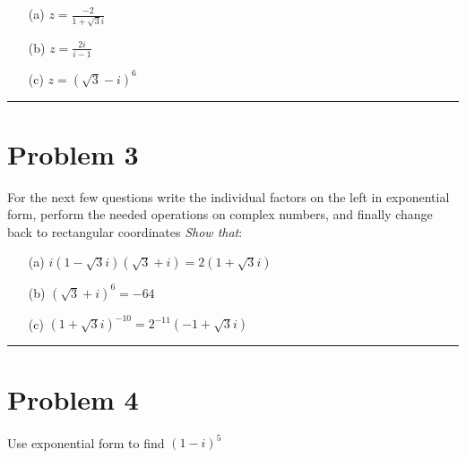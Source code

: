 \documentclass{article}
\begin{document}
\begin{enumerate}
    \item[(a)] $z=\frac{-2}{1+\sqrt{3}i}$ 
    \vspace{4cm}
    
    \item[(b)] $z=\frac{2i}{i-1}$ 
    \vspace{4cm}
    
    \item[(c)] $z=(\sqrt{3}-i)^{6}$ 
    \vspace{4cm}
\end{enumerate}

\hrule

\section*{Problem 3}
For the next few questions write the individual factors on the left in exponential form, perform the needed operations on complex numbers, and finally change back to rectangular coordinates \textit{Show that}: 

\begin{enumerate}
    \item[(a)] $i(1-\sqrt{3}i)(\sqrt{3}+i)=2(1+\sqrt{3}i)$ 
    \vspace{5cm}
    
    \item[(b)] $(\sqrt{3}+i)^{6}=-64$ 
    \vspace{5cm}
    
    \item[(c)] $(1+\sqrt{3}i)^{-10}=2^{-11}(-1+\sqrt{3}i)$ 
    \vspace{5cm}
\end{enumerate}

\hrule

\section*{Problem 4}
Use exponential form to find $(1-i)^{5}$

\vspace{6cm}
\end{document}
